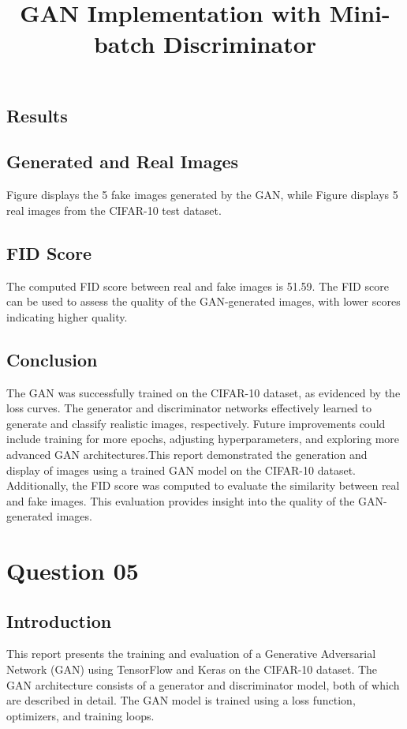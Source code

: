 \documentclass{article}
\begin{document}
\subsection{Results}

\subsection{Generated and Real Images}
Figure displays the 5 fake images generated by the GAN, while Figure displays 5 real images from the CIFAR-10 test dataset.


\subsection{FID Score}
The computed FID score between real and fake images is 51.59. The FID score can be used to assess the quality of the GAN-generated images, with lower scores indicating higher quality.

\subsection{Conclusion}
The GAN was successfully trained on the CIFAR-10 dataset, as evidenced by the loss curves. The generator and discriminator networks effectively learned to generate and classify realistic images, respectively. Future improvements could include training for more epochs, adjusting hyperparameters, and exploring more advanced GAN architectures.This report demonstrated the generation and display of images using a trained GAN model on the CIFAR-10 dataset. Additionally, the FID score was computed to evaluate the similarity between real and fake images. This evaluation provides insight into the quality of the GAN-generated images.







\section{Question 05}
\title{GAN Implementation with Mini-batch Discriminator}
\subsection{Introduction}
This report presents the training and evaluation of a Generative Adversarial Network (GAN) using TensorFlow and Keras on the CIFAR-10 dataset. The GAN architecture consists of a generator and discriminator model, both of which are described in detail. The GAN model is trained using a loss function, optimizers, and training loops.
\end{document}
